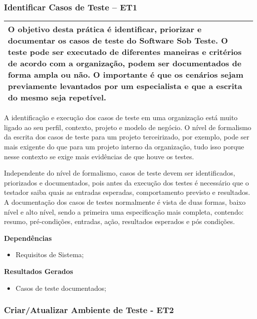 \subsubsection{Identificar Casos de Teste – ET1}
\label{sec:et1}

\begin{table}[!ht]
\centering
\begin{tabular}{|p{130mm}|}
\hline
O objetivo desta prática é identificar, priorizar e documentar os casos de teste do Software Sob Teste. O teste pode ser executado de diferentes maneiras e critérios de acordo com a organização, podem ser documentados de forma ampla ou não. O importante é que os cenários sejam previamente levantados por um especialista e que a escrita do mesmo seja repetível. \\ 
\hline
\end{tabular}
\end{table}

A identificação e execução dos casos de teste em uma organização está muito ligado ao seu perfil, contexto, projeto e modelo de negócio. O nível de formalismo da escrita dos casos de teste para um projeto terceirizado, por exemplo, pode ser mais exigente do que para um projeto interno da organização, tudo isso porque nesse contexto se exige mais evidências de que houve os testes.

Independente do nível de formalismo, casos de teste devem ser identificados, priorizados e documentados, pois antes da execução dos testes é necessário que o testador saiba quais as entradas esperadas, comportamento previsto e resultados. A documentação dos casos de testes normalmente é vista de duas formas, baixo nível e alto nível, sendo a primeira uma especificação mais completa, contendo: resumo, pré-condições, entradas, ação, resultados esperados e pós condições.

\textbf{Dependências}
\begin{itemize}
    \item Requisitos de Sistema;
\end{itemize}

\textbf{Resultados Gerados}
\begin{itemize}
    \item  Casos de teste documentados;
\end{itemize}

\subsubsection{Criar/Atualizar Ambiente de Teste - ET2}
\label{sec:et2}

